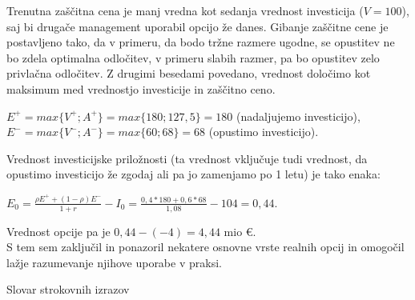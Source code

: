 Trenutna zaščitna cena je manj vredna kot sedanja vrednost investicija ($V = 100$), saj bi drugače management uporabil opcijo že danes. Gibanje zaščitne cene je postavljeno tako, da v primeru, da bodo tržne razmere ugodne, se opustitev ne bo zdela optimalna odločitev, v primeru slabih razmer, pa bo opustitev zelo privlačna odločitev. Z drugimi besedami povedano, vrednost določimo kot maksimum med vrednostjo investicije in zaščitno ceno.
\begin{center}
$E^+ = max\{V^+; A^+\}= max\{180; 127,5\} = 180$ (nadaljujemo investicijo), \\[0,5 cm]
$E^- = max\{V^-; A^-\}= max\{60; 68\} = 68$ (opustimo investicijo). \\[0,5 cm]
\end{center}

Vrednost investicijske priložnosti (ta vrednost vključuje tudi vrednost, da opustimo investicijo že zgodaj ali pa jo zamenjamo po 1 letu) je tako enaka: \\[0,5 cm]
\begin{center}
$E_0 = \tfrac{\rho E^+ + (1-\rho)E^-}{1+r}-I_0 = \tfrac{0,4*180+0,6*68}{1,08} -104 = 0,44$. 
\end{center}

Vrednost opcije pa je $0,44-(-4)=4,44$ mio €. \\

S tem sem zaključil in ponazoril nekatere osnovne vrste realnih opcij in omogočil lažje razumevanje njihove uporabe v praksi.


\pagebreak
\begin{center}
\large{Slovar strokovnih izrazov}
\end{center}

